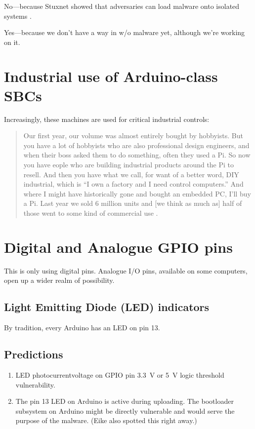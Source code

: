 \documentclass[a4paper,notitlepage]{article}
\begin{document}
No---because Stuxnet showed that adversaries can load malware onto isolated
systems \cite{Goldberg2019b,Winer2019,Zetter2019}.

Yes---because we don't have a way in w/o malware yet, although we're working on
it.
\section{Industrial use of Arduino-class SBCs}
Increasingly, these machines are used for critical industrial controls:
\begin{quote}
Our first year, our volume was almost entirely bought by hobbyists. But you
have a lot of hobbyists who are also professional design engineers, and when
their boss asked them to do something, often they used a Pi. So now you have
eople who are building industrial products around the Pi to resell. And then
you have what we call, for want of a better word, DIY industrial, which
is ``I own a factory and I need control computers.'' And where I might have
historically gone and bought an embedded PC, I'll buy a Pi. Last year we sold 6
million units and [we think as much as] half of those went to some kind of
commercial use \cite{Cass2019b}.
\end{quote}
\section{Digital and Analogue GPIO pins}
This is only using digital pins. Analogue I/O pins, available on some
computers, open up a wider realm of possibility.
\subsection{Light Emitting Diode (LED) indicators}
By tradition, every Arduino has an LED on pin 13.
\subsection{Predictions}
\begin{enumerate}
  \item LED photocurrent\textrightarrow voltage on GPIO pin\textrightarrow
    \SI{3.3}{\volt} or \SI{5}{\volt} logic threshold\textrightarrow
    vulnerability.
  \item The pin 13 LED on Arduino is active during uploading. The bootloader
    subsystem on Arduino might be directly vulnerable and would serve the
    purpose of the malware. (Eike also spotted this right away.)
\end{enumerate}
\end{document}
